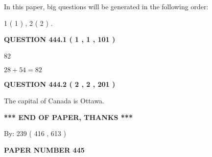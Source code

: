 \documentclass[12pt]{article}
\begin{document}
   
   
\vspace{0.2in}
   
In this paper, big questions will be generated in the following order: 
   
   
   1 ( 1 )
 ,
   2 ( 2 )
 .
  
\vspace{0.2in}
  
{\textbf{\Large{QUESTION
444.1 
 ( 1 , 1 , 101 )
}}}
  
  
 
 
\noindent{}

82
 
 
 
 
\noindent{}

$ %
28 +  %
54=   %
82$
 
 
  
\vspace{0.2in}
  
{\textbf{\Large{QUESTION
444.2 
 ( 2 , 2 , 201 )
}}}
  
  
 
 
\noindent{}
 
 
The capital of Canada is Ottawa.
 
 
 
 
   
   
 \vspace{0.2in}
 
   
   
   
   
\vspace{1.0in} 
{\textbf{\large{ *** END OF PAPER, THANKS *** }}} 
   
   
\hspace{1.0in} By: 
 239 ( 416 ,  613 )
   
   
   
   
\newpage 
\setcounter{page}{ 
   445001 } 
   
   
   
   
 {\textbf{ \Large{ PAPER NUMBER  445  }}}
   
   
\vspace{0.2in}
   
   
   
\end{document}

